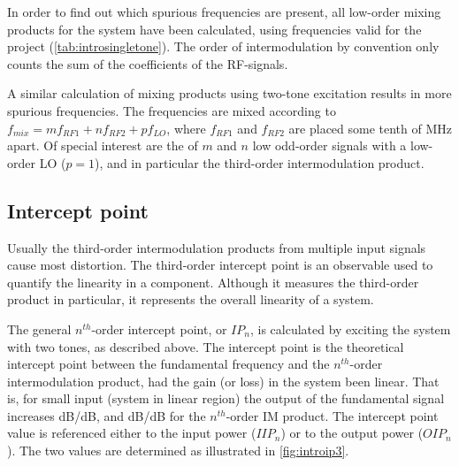 		In order to find out which spurious frequencies are present, all low-order mixing products for the system have been calculated, using frequencies valid for the project (\autoref{tab:introsingletone}). %
		The order of intermodulation by convention only counts the sum of the coefficients of the RF-signals.
		
		A similar calculation of mixing products using two-tone excitation results in more spurious frequencies. The frequencies are mixed according to $f_{mix} = mf_{RF1} + nf_{RF2} + pf_{LO}$, where $f_{RF1}$ and $f_{RF2}$ are placed some tenth of MHz apart. Of special interest are the of $m$ and $n$ low odd-order signals with a low-order LO ($p=1$), and in particular the third-order intermodulation product.
	
		\subsection{Intercept point} \label{sec:ip3}
			Usually the third-order intermodulation products from multiple input signals cause most distortion. The third-order intercept point is an observable used to quantify the linearity in a component. Although it measures the third-order product in particular, it represents the overall linearity of a system.
			
			The general $n^{th}$-order intercept point, or $IP_n$, is calculated by exciting the system with two tones, as described above. The intercept point is the theoretical intercept point between the fundamental frequency and the $n^{th}$-order intermodulation product, had the gain (or loss) in the system been linear.\autocite{bahl03,pozar90} That is, for small input (system in linear region) the output of the fundamental signal increases \unit[1]{dB/dB}, and \unit[n]{dB/dB} for the $n^{th}$-order IM product. %
			The intercept point value is referenced either to the input power ($IIP_n$) or to the output power ($OIP_n$). The two values are determined as illustrated in \autoref{fig:introip3}.
			
